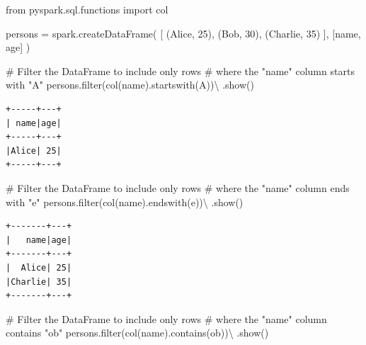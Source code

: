 \documentclass[
  11pt,
  letterpaper,
  DIV=11,
  numbers=noendperiod]{scrreprt}
\newenvironment{Shaded}{\begin{snugshade}}{\end{snugshade}}
\newcommand{\BuiltInTok}[1]{\textcolor[rgb]{0.00,0.23,0.31}{#1}}
\newcommand{\CommentTok}[1]{\textcolor[rgb]{0.37,0.37,0.37}{#1}}
\newcommand{\DecValTok}[1]{\textcolor[rgb]{0.68,0.00,0.00}{#1}}
\newcommand{\ImportTok}[1]{\textcolor[rgb]{0.00,0.46,0.62}{#1}}
\newcommand{\NormalTok}[1]{\textcolor[rgb]{0.00,0.23,0.31}{#1}}
\newcommand{\OperatorTok}[1]{\textcolor[rgb]{0.37,0.37,0.37}{#1}}
\newcommand{\StringTok}[1]{\textcolor[rgb]{0.13,0.47,0.30}{#1}}
\begin{document}
\begin{Shaded}
\begin{Highlighting}[]
\ImportTok{from}\NormalTok{ pyspark.sql.functions }\ImportTok{import}\NormalTok{ col}

\NormalTok{persons }\OperatorTok{=}\NormalTok{ spark.createDataFrame(}
\NormalTok{  [}
\NormalTok{    (}\StringTok{\textquotesingle{}Alice\textquotesingle{}}\NormalTok{, }\DecValTok{25}\NormalTok{),}
\NormalTok{    (}\StringTok{\textquotesingle{}Bob\textquotesingle{}}\NormalTok{, }\DecValTok{30}\NormalTok{),}
\NormalTok{    (}\StringTok{\textquotesingle{}Charlie\textquotesingle{}}\NormalTok{, }\DecValTok{35}\NormalTok{)}
\NormalTok{  ],}
\NormalTok{  [}\StringTok{\textquotesingle{}name\textquotesingle{}}\NormalTok{, }\StringTok{\textquotesingle{}age\textquotesingle{}}\NormalTok{]}
\NormalTok{)}

\CommentTok{\# Filter the DataFrame to include only rows}
\CommentTok{\# where the "name" column starts with "A"}
\NormalTok{persons.}\BuiltInTok{filter}\NormalTok{(col(}\StringTok{\textquotesingle{}name\textquotesingle{}}\NormalTok{).startswith(}\StringTok{\textquotesingle{}A\textquotesingle{}}\NormalTok{))}\OperatorTok{\textbackslash{}}
\NormalTok{  .show()}
\end{Highlighting}
\end{Shaded}

\begin{verbatim}
+-----+---+
| name|age|
+-----+---+
|Alice| 25|
+-----+---+
\end{verbatim}

\begin{Shaded}
\begin{Highlighting}[]
\CommentTok{\# Filter the DataFrame to include only rows}
\CommentTok{\# where the "name" column ends with "e"}
\NormalTok{persons.}\BuiltInTok{filter}\NormalTok{(col(}\StringTok{\textquotesingle{}name\textquotesingle{}}\NormalTok{).endswith(}\StringTok{\textquotesingle{}e\textquotesingle{}}\NormalTok{))}\OperatorTok{\textbackslash{}}
\NormalTok{  .show()}
\end{Highlighting}
\end{Shaded}

\begin{verbatim}
+-------+---+
|   name|age|
+-------+---+
|  Alice| 25|
|Charlie| 35|
+-------+---+
\end{verbatim}

\begin{Shaded}
\begin{Highlighting}[]
\CommentTok{\# Filter the DataFrame to include only rows}
\CommentTok{\# where the "name" column contains "ob"}
\NormalTok{persons.}\BuiltInTok{filter}\NormalTok{(col(}\StringTok{\textquotesingle{}name\textquotesingle{}}\NormalTok{).contains(}\StringTok{\textquotesingle{}ob\textquotesingle{}}\NormalTok{))}\OperatorTok{\textbackslash{}}
\NormalTok{  .show()}
\end{Highlighting}
\end{Shaded}
\end{document}
